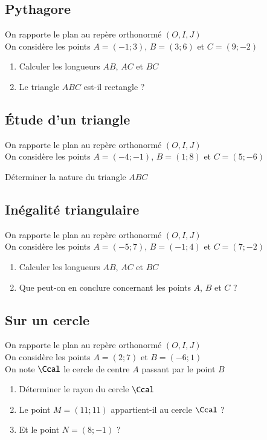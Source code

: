 \documentclass[oneside,12pt]{article}          %
\begin{document}
\subsection{Pythagore}
On rapporte le plan au repère orthonormé $(O,I,J)$\\
On considère les points $A=(-1;3)$, $B=(3;6)$ et $C=(9;-2)$
\begin{enumerate}
	\item Calculer les longueurs $AB$, $AC$ et $BC$
	\item Le triangle $ABC$ est-il rectangle ?
\end{enumerate}



\subsection{Étude d'un triangle}
On rapporte le plan au repère orthonormé $(O,I,J)$\\
On considère les points $A=(-4;-1)$, $B=(1;8)$ et $C=(5;-6)$

Déterminer la nature du triangle $ABC$



\subsection{Inégalité triangulaire}
On rapporte le plan au repère orthonormé $(O,I,J)$\\
On considère les points $A=(-5;7)$, $B=(-1;4)$ et $C=(7;-2)$
\begin{enumerate}
	\item Calculer les longueurs $AB$, $AC$ et $BC$
	\item Que peut-on en conclure concernant les points $A$, $B$ et $C$ ?
\end{enumerate}



\subsection{Sur un cercle}
On rapporte le plan au repère orthonormé $(O,I,J)$\\
On considère les points $A=(2;7)$ et $B=(-6;1)$ \\
On note $\Ccal$ le cercle de centre $A$ passant par le point $B$
\begin{enumerate}
	\item Déterminer le rayon du cercle $\Ccal$
	\item Le point $M=(11;11)$ appartient-il au cercle $\Ccal$ ?
	\item Et le point $N=(8;-1)$ ?
\end{enumerate}
\end{document}
